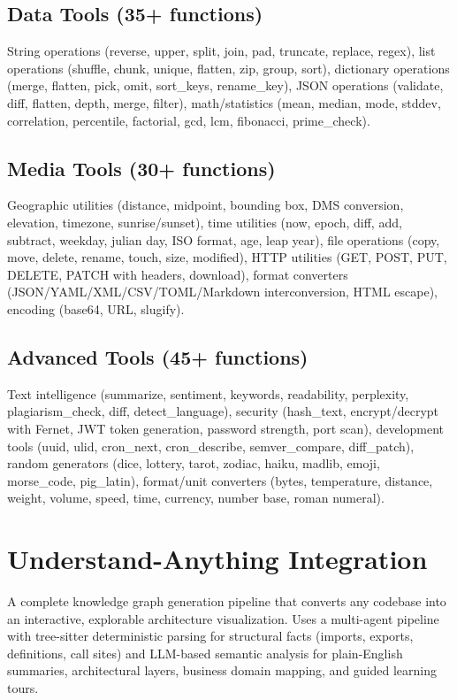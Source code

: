 \documentclass[12pt,a4paper,twoside]{report}
\begin{document}
\subsection{Data Tools (35+ functions)}
String operations (reverse, upper, split, join, pad, truncate, replace, regex), list operations (shuffle, chunk, unique, flatten, zip, group, sort), dictionary operations (merge, flatten, pick, omit, sort\_keys, rename\_key), JSON operations (validate, diff, flatten, depth, merge, filter), math/statistics (mean, median, mode, stddev, correlation, percentile, factorial, gcd, lcm, fibonacci, prime\_check).

\subsection{Media Tools (30+ functions)}
Geographic utilities (distance, midpoint, bounding box, DMS conversion, elevation, timezone, sunrise/sunset), time utilities (now, epoch, diff, add, subtract, weekday, julian day, ISO format, age, leap year), file operations (copy, move, delete, rename, touch, size, modified), HTTP utilities (GET, POST, PUT, DELETE, PATCH with headers, download), format converters (JSON/YAML/XML/CSV/TOML/Markdown interconversion, HTML escape), encoding (base64, URL, slugify).

\subsection{Advanced Tools (45+ functions)}
Text intelligence (summarize, sentiment, keywords, readability, perplexity, plagiarism\_check, diff, detect\_language), security (hash\_text, encrypt/decrypt with Fernet, JWT token generation, password strength, port scan), development tools (uuid, ulid, cron\_next, cron\_describe, semver\_compare, diff\_patch), random generators (dice, lottery, tarot, zodiac, haiku, madlib, emoji, morse\_code, pig\_latin), format/unit converters (bytes, temperature, distance, weight, volume, speed, time, currency, number base, roman numeral).

\section{Understand-Anything Integration}

A complete knowledge graph generation pipeline that converts any codebase into an interactive, explorable architecture visualization. Uses a multi-agent pipeline with tree-sitter deterministic parsing for structural facts (imports, exports, definitions, call sites) and LLM-based semantic analysis for plain-English summaries, architectural layers, business domain mapping, and guided learning tours.
\end{document}
